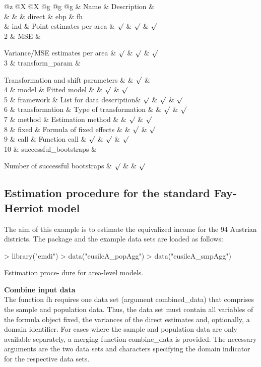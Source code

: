 @z @X @X @g @g @g \& Name \& Description \&\\
\& \& \& direct \& ebp \& fh\\
\& ind \& Point estimates per area \& \(\surd\) \& \(\surd\) \& \(\surd\)\\
2 \& MSE \&

Variance/MSE estimates per area \& \(\surd\) \& \(\surd\) \& \(\surd\)\\
3 \& transform\_param \&

Transformation and shift parameters \& \& \(\surd\) \&\\
4 \& model \& Fitted model \& \& \(\surd\) \& \(\surd\)\\
5 \& framework \& List for data description\& \(\surd\) \& \(\surd\) \& \(\surd\)\\
6 \& transformation \& Type of transformation \& \& \(\surd\) \& \(\surd\)\\
7 \& method \& Estimation method \& \& \(\surd\) \& \(\surd\)\\
8 \& fixed \& Formula of fixed effects \& \& \(\surd\) \& \(\surd\)\\
9 \& call \& Function call \& \(\surd\) \& \(\surd\) \& \(\surd\)\\
10 \& successful\_bootstraps \&

Number of successful bootstraps \& \(\surd\) \& \& \(\surd\)\\

\hypertarget{sec:functionalitystd}{%
\subsection{Estimation procedure for the standard Fay-Herriot model}\label{sec:functionalitystd}}

The aim of this example is to estimate the equivalized income for the 94
Austrian districts. The package and the example data sets are loaded as
follows:

\begin{example}
\textgreater{} library("emdi") \textgreater{} data("eusilcA\_popAgg") \textgreater{}
data("eusilcA\_smpAgg")
\end{example}

Estimation proce- dure for area-level models.

\textbf{Combine input data}\\
The function fh requires one data set (argument combined\_data) that
comprises the sample and population data. Thus, the data set must
contain all variables of the formula object fixed, the variances of the
direct estimates and, optionally, a domain identifier. For cases where
the sample and population data are only available separately, a merging
function combine\_data is provided. The necessary arguments are the two
data sets and characters specifying the domain indicator for the
respective data sets.

